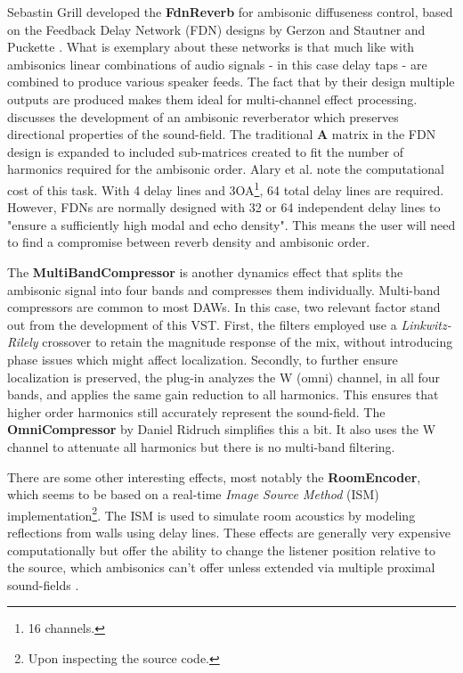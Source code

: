 Sebastin Grill developed the \textbf{FdnReverb} for ambisonic diffuseness control, based on the Feedback Delay Network (FDN) designs by Gerzon \cite{gerzon1976unitary} and Stautner and Puckette \cite{stautner1982designing}. What is exemplary about these networks is that much like with ambisonics linear combinations of audio signals - in this case delay taps - are combined to produce various speaker feeds. The fact that by their design multiple outputs are produced makes them ideal for multi-channel effect processing. \cite{alary2019directional} discusses the development of an ambisonic reverberator which preserves directional properties of the sound-field. The traditional $\mathbf{A}$ matrix in the FDN design is expanded to included sub-matrices created to fit the number of harmonics required for the ambisonic order. Alary et al. \cite{alary2019directional} note the computational cost of this task. With 4 delay lines and 3OA\footnote{16 channels.}, 64 total delay lines are required. However, FDNs are normally designed with 32 or 64 independent delay lines to "ensure a sufficiently high modal and echo density". This means the user will need to find a compromise between reverb density and ambisonic order.


The \textbf{MultiBandCompressor} is another dynamics effect that splits the ambisonic signal into four bands and compresses them individually. Multi-band compressors are common to most DAWs. In this case, two relevant factor stand out from the development of this VST. First, the filters employed use a \textit{Linkwitz-Rilely} crossover to retain the magnitude response of the mix, without introducing phase issues which might affect localization. Secondly, to further ensure localization is preserved, the plug-in analyzes the W (omni) channel, in all four bands, and applies the same gain reduction to all harmonics. This ensures that higher order harmonics still accurately represent the sound-field. The \textbf{OmniCompressor} by Daniel Ridruch simplifies this a bit. It also uses the W channel to attenuate all harmonics but there is no multi-band filtering. 

There are some other interesting effects, most notably the \textbf{RoomEncoder}, which seems to be based on a real-time \textit{Image Source Method} (ISM) implementation\footnote{Upon inspecting the source code.}. The ISM is used to simulate room acoustics by modeling reflections from walls using delay lines. These effects are generally very expensive computationally but offer the ability to change the listener position relative to the source, which ambisonics can't offer unless extended via multiple proximal sound-fields \cite{tylka2019domains}. 

